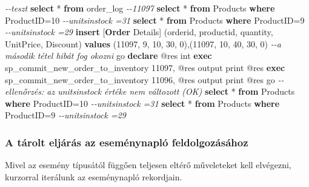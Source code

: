 \documentclass[
  magyar,
]{article}
\newenvironment{Shaded}{}{}
\newcommand{\CommentTok}[1]{\textcolor[rgb]{0.38,0.63,0.69}{\textit{#1}}}
\newcommand{\DataTypeTok}[1]{\textcolor[rgb]{0.56,0.13,0.00}{#1}}
\newcommand{\DecValTok}[1]{\textcolor[rgb]{0.25,0.63,0.44}{#1}}
\newcommand{\KeywordTok}[1]{\textcolor[rgb]{0.00,0.44,0.13}{\textbf{#1}}}
\newcommand{\NormalTok}[1]{#1}
\newcommand{\OperatorTok}[1]{\textcolor[rgb]{0.40,0.40,0.40}{#1}}
\begin{document}
\begin{Shaded}
\begin{Highlighting}[]
\CommentTok{{-}{-}teszt}
\KeywordTok{select} \OperatorTok{*} \KeywordTok{from}\NormalTok{ order\_log  }\CommentTok{{-}{-}11097}
\KeywordTok{select} \OperatorTok{*} \KeywordTok{from}\NormalTok{ Products }\KeywordTok{where}\NormalTok{ ProductID}\OperatorTok{=}\DecValTok{10}  \CommentTok{{-}{-}unitsinstock =31}
\KeywordTok{select} \OperatorTok{*} \KeywordTok{from}\NormalTok{ Products }\KeywordTok{where}\NormalTok{ ProductID}\OperatorTok{=}\DecValTok{9}   \CommentTok{{-}{-}unitsinstock =29}
\KeywordTok{insert}\NormalTok{ [}\KeywordTok{Order}\NormalTok{ Details] (orderid, productid, quantity, UnitPrice, Discount)}
\KeywordTok{values}\NormalTok{ (}\DecValTok{11097}\NormalTok{, }\DecValTok{9}\NormalTok{, }\DecValTok{10}\NormalTok{, }\DecValTok{30}\NormalTok{, }\DecValTok{0}\NormalTok{),(}\DecValTok{11097}\NormalTok{, }\DecValTok{10}\NormalTok{, }\DecValTok{40}\NormalTok{, }\DecValTok{30}\NormalTok{, }\DecValTok{0}\NormalTok{)  }\CommentTok{{-}{-}a második tétel hibát fog okozni}
\NormalTok{go}
\KeywordTok{declare}\NormalTok{ @res }\DataTypeTok{int}
\KeywordTok{exec}\NormalTok{ sp\_commit\_new\_order\_to\_inventory }\DecValTok{11097}\NormalTok{, @res output}
\NormalTok{print @res}
\KeywordTok{exec}\NormalTok{ sp\_commit\_new\_order\_to\_inventory }\DecValTok{11096}\NormalTok{, @res output}
\NormalTok{print @res}
\NormalTok{go}
\CommentTok{{-}{-}ellenőrzés: az unitsinstock értéke nem változott (OK)}
\KeywordTok{select} \OperatorTok{*} \KeywordTok{from}\NormalTok{ Products }\KeywordTok{where}\NormalTok{ ProductID}\OperatorTok{=}\DecValTok{10}  \CommentTok{{-}{-}unitsinstock =31}
\KeywordTok{select} \OperatorTok{*} \KeywordTok{from}\NormalTok{ Products }\KeywordTok{where}\NormalTok{ ProductID}\OperatorTok{=}\DecValTok{9}   \CommentTok{{-}{-}unitsinstock =29}
\end{Highlighting}
\end{Shaded}

\subsubsection{A tárolt eljárás az eseménynapló
feldolgozásához}\label{a-tuxe1rolt-eljuxe1ruxe1s-az-esemuxe9nynapluxf3-feldolgozuxe1suxe1hoz}

Mivel az esemény típusától függően teljesen eltérő műveleteket kell
elvégezni, kurzorral iterálunk az eseménynapló rekordjain.
\end{document}
